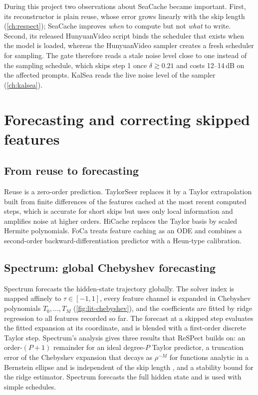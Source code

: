 During this project two observations about SeaCache became important. First, its reconstructor is plain reuse, whose error grows linearly with the skip length (\cref{ch:respect}); SeaCache improves \emph{when} to compute but not \emph{what} to write. Second, its released HunyuanVideo script binds the scheduler that exists when the model is loaded, whereas the HunyuanVideo sampler creates a fresh scheduler for sampling. The gate therefore reads a stale noise level close to one instead of the sampling schedule, which skips step 1 once $\delta\gtrsim 0.21$ and costs 12--14\,dB on the affected prompts. KalSea reads the live noise level of the sampler (\cref{ch:kalsea}).

\section{Forecasting and correcting skipped features}\label{sec:lit-forecast}

\subsection{From reuse to forecasting}
Reuse is a zero-order prediction. TaylorSeer \citep{liu2025taylorseer} replaces it by a Taylor extrapolation built from finite differences of the features cached at the most recent computed steps, which is accurate for short skips but uses only local information and amplifies noise at higher orders. HiCache \citep{feng2026hicache} replaces the Taylor basis by scaled Hermite polynomials. FoCa \citep{zheng2026foca} treats feature caching as an ODE and combines a second-order backward-differentiation predictor with a Heun-type calibration.

\subsection{Spectrum: global Chebyshev forecasting}
Spectrum \citep{han2026spectrum} forecasts the hidden-state trajectory globally. The solver index is mapped affinely to $\tau\in[-1,1]$, every feature channel is expanded in Chebyshev polynomials $T_0,\dots,T_M$ (\cref{fig:lit-chebyshev}), and the coefficients are fitted by ridge regression \citep{hoerl1970ridge} to all features recorded so far. The forecast at a skipped step evaluates the fitted expansion at its coordinate, and is blended with a first-order discrete Taylor step. Spectrum's analysis gives three results that ReSPect builds on: an order-$(P{+}1)$ remainder for an ideal degree-$P$ Taylor predictor, a truncation error of the Chebyshev expansion that decays as $\rho^{-M}$ for functions analytic in a Bernstein ellipse and is independent of the skip length \citep{trefethen2019approximation}, and a stability bound for the ridge estimator. Spectrum forecasts the full hidden state and is used with simple schedules.

